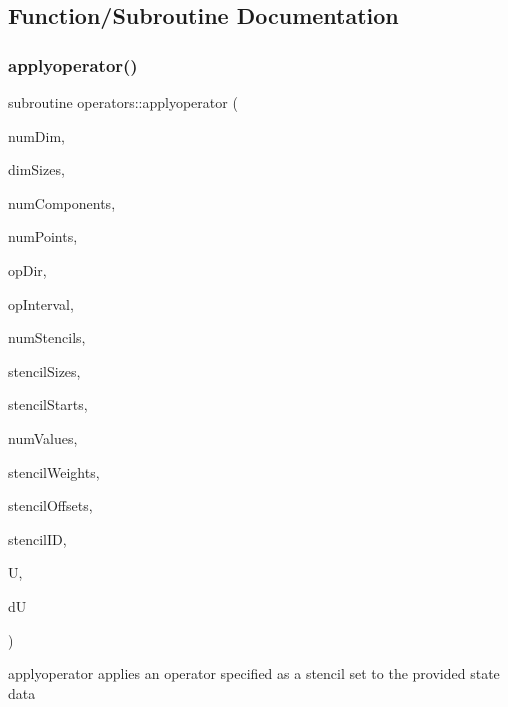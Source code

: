 \subsection{Function/\+Subroutine Documentation}
\hypertarget{namespaceoperators_aee961d7de8b2c319cd0270f5ae735de7}{}\label{namespaceoperators_aee961d7de8b2c319cd0270f5ae735de7} 
\subsubsection{\texorpdfstring{applyoperator()}{applyoperator()}}
{\footnotesize\ttfamily subroutine operators\+::applyoperator (\begin{DoxyParamCaption}\item[{integer(kind=4), intent(in)}]{num\+Dim,  }\item[{integer(kind=8), dimension(numdim), intent(in)}]{dim\+Sizes,  }\item[{integer(kind=4), intent(in)}]{num\+Components,  }\item[{integer(kind=8), intent(in)}]{num\+Points,  }\item[{integer(kind=4), intent(in)}]{op\+Dir,  }\item[{integer(kind=8), dimension(2$\ast$numdim), intent(in)}]{op\+Interval,  }\item[{integer(kind=4), intent(in)}]{num\+Stencils,  }\item[{integer(kind=4), dimension(numstencils), intent(in)}]{stencil\+Sizes,  }\item[{integer(kind=4), dimension(numstencils), intent(in)}]{stencil\+Starts,  }\item[{integer(kind=4), intent(in)}]{num\+Values,  }\item[{real(kind=8), dimension(numvalues), intent(in)}]{stencil\+Weights,  }\item[{integer(kind=4), dimension(numvalues), intent(in)}]{stencil\+Offsets,  }\item[{integer(kind=4), dimension(numpoints), intent(in)}]{stencil\+ID,  }\item[{real(kind=8), dimension(numpoints$\ast$numcomponents), intent(in), target}]{U,  }\item[{real(kind=8), dimension(numpoints$\ast$numcomponents), intent(out), target}]{dU }\end{DoxyParamCaption})}



applyoperator applies an operator specified as a stencil set to the provided state data 

